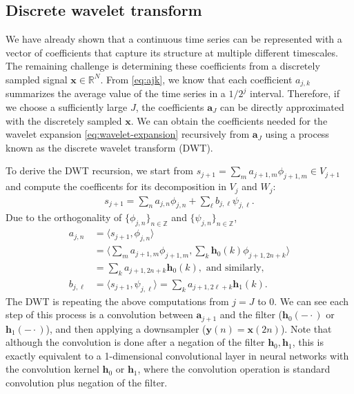 \documentclass{article}
\newcommand{\inner}[2]{\langle{#1},{#2}\rangle}
\theoremstyle{plain}
\theoremstyle{definition}
\theoremstyle{remark}
\begin{document}
\subsection{Discrete wavelet transform}
\label{app:dwt}

We have already shown that a continuous time series can be represented with a vector of coefficients that capture its structure at multiple different timescales. 
The remaining challenge is determining these coefficients from a discretely sampled signal $\mathbf x \in \mathbb{R}^N$. 
From \eqref{eq:ajk}, we know that each coefficient $a_{j,k}$ summarizes the average value of the time series in a $1/2^j$ interval. 
Therefore, if we choose a sufficiently large $J$, the coefficients $\mathbf{a}_{J}$ can be directly approximated with the discretely sampled $\mathbf x$. 
We can obtain the coefficients needed for the wavelet expansion \eqref{eq:wavelet-expansion} recursively from $\mathbf{a}_{J}$ using a process known as the discrete wavelet transform (DWT).

To derive the DWT recursion, we start from $s_{j+1} = \sum_{m} a_{j+1, m}\phi_{j+1,m} \in V_{j+1}$ and compute the coefficents for its decomposition in $V_j$ and $W_j$:
\begin{align*}
    s_{j+1} = \sum_{n} a_{j,n} \phi_{j,n} + \sum_{\ell} b_{j, \ell}\psi_{j,\ell}. 
\end{align*}
Due to the orthogonality of $\{\phi_{j, n}\}_{n\in \mathbb{Z}}$ and $\{\psi_{j, n}\}_{n\in \mathbb{Z}}$, 
\begin{align*}
    a_{j, n} &= \inner{s_{j+1}}{\phi_{j,n}} \\
    &= \inner{\sum_m a_{j+1,m} \phi_{j+1,m}}{\sum_k \mathbf h_0(k) \phi_{j+1, 2n + k}} \\
    &= \sum_{k} a_{j+1, 2n + k}  \mathbf h_0(k), \text{ and similarly,}\\
    b_{j, \ell} &= \inner{s_{j+1}}{\psi_{j,\ell}} = \sum_{k} a_{j+1, 2\ell + k}  \mathbf h_1(k). 
\end{align*}
The DWT is repeating the above computations from $j=J$ to $0$. 
We can see each step of this process is a convolution between $\mathbf a_{j+1}$ and the filter ($\mathbf h_0(-\cdot)$ or $\mathbf h_1(-\cdot)$), and then applying a downsampler ($\mathbf y(n) = \mathbf x(2n)$). 
Note that although the convolution is done after a negation of the filter $\mathbf h_0, \mathbf h_1$, this is exactly equivalent to a 1-dimensional convolutional layer in neural networks with the convolution kernel $\mathbf h_0$ or $\mathbf h_1$, where the convolution operation is standard convolution plus negation of the filter.  
\end{document}
